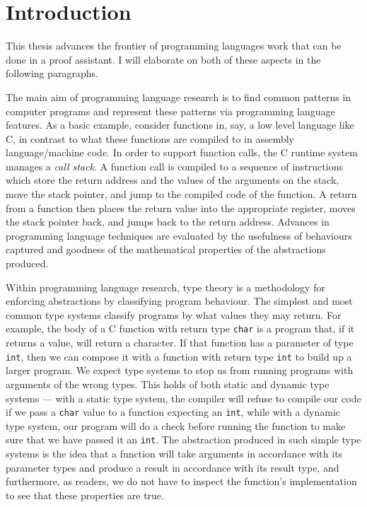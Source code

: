 \chapter{Introduction}

This thesis advances the frontier of programming languages work that can be done
in a proof assistant.
I will elaborate on both of these aspects in the following paragraphs.

The main aim of programming language research is to find common patterns in
computer programs and represent these patterns via programming language
features.
As a basic example, consider functions in, say, a low level language like C, in
contrast to what these functions are compiled to in assembly language/machine
code.
In order to support function calls, the C runtime system manages a
\emph{call stack}.
A function call is compiled to a sequence of instructions which store the return
address and the values of the arguments on the stack, move the stack pointer,
and jump to the compiled code of the function.
A return from a function then places the return value into the appropriate
register, moves the stack pointer back, and jumps back to the return address.
Advances in programming language techniques are evaluated by the usefulness of
behaviours captured and goodness of the mathematical properties of the
abstractions produced.

Within programming language research, type theory is a methodology for enforcing
abstractions by classifying program behaviour.
The simplest and most common type systems classify programs by what values they
may return.
For example, the body of a C function with return type \texttt{char} is a
program that, if it returns a value, will return a character.
If that function has a parameter of type \texttt{int}, then we can compose it
with a function with return type \texttt{int} to build up a larger program.
We expect type systems to stop us from running programs with arguments of the
wrong types.
This holds of both static and dynamic type systems --- with a static type
system, the compiler will refuse to compile our code if we pass a \texttt{char}
value to a function expecting an \texttt{int}, while with a dynamic type system,
our program will do a check before running the function to make sure that we
have passed it an \texttt{int}.
The abstraction produced in such simple type systems is the idea that a function
will take arguments in accordance with its parameter types and produce a result
in accordance with its result type, and furthermore, as readers, we do not have
to inspect the function's implementation to see that these properties are true.


